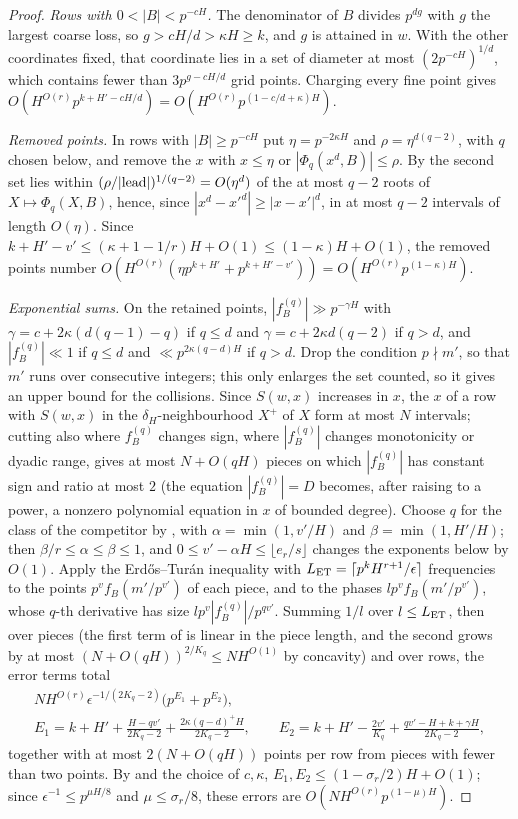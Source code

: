 \documentclass[11pt]{article}
\begin{document}
\begin{proof}
\emph{Rows with $0<|B|<p^{-cH}$.} The denominator of $B$ divides $p^{dg}$ with $g$ the largest coarse
loss, so $g>cH/d>\kappa H\ge k$, and $g$ is attained in $w$. With the other coordinates fixed, that
coordinate lies in a set of diameter at most $(2p^{-cH})^{1/d}$, which contains fewer than $3p^{g-cH/d}$
grid points. Charging every fine point gives $O(H^{O(r)}p^{k+H'-cH/d})=O(H^{O(r)}p^{(1-c/d+\kappa)H})$.

\emph{Removed points.} In rows with $|B|\ge p^{-cH}$ put $\eta=p^{-2\kappa H}$ and $\rho=\eta^{d(q-2)}$, with
$q$ chosen below, and remove the $x$ with $x\le\eta$ or $|\Phi_q(x^d,B)|\le\rho$. By  the
second set lies within $(\rho/|{\rm lead}|)^{1/(q-2)}=O(\eta^d)$ of the at most $q-2$ roots of
$X\mapsto\Phi_q(X,B)$, hence, since $|x^d-x'^d|\ge|x-x'|^d$, in at most $q-2$ intervals of length
$O(\eta)$. Since $k+H'-v'\le(\kappa+1-1/r)H+O(1)\le(1-\kappa)H+O(1)$, the removed points number
$O(H^{O(r)}(\eta p^{k+H'}+p^{k+H'-v'}))=O(H^{O(r)}p^{(1-\kappa)H})$.

\emph{Exponential sums.} On the retained points, $|f_B^{(q)}|\gg p^{-\gamma H}$ with
$\gamma=c+2\kappa(d(q-1)-q)$ if $q\le d$ and $\gamma=c+2\kappa d(q-2)$ if $q>d$, and $|f_B^{(q)}|\ll1$ if
$q\le d$ and $\ll p^{2\kappa(q-d)H}$ if $q>d$. Drop the condition $p\nmid m'$, so that $m'$ runs over
consecutive integers; this only enlarges the set counted, so it gives an upper bound for the collisions. Since $S(w,x)$ increases in $x$, the
$x$ of a row with $S(w,x)$ in the $\delta_H$-neighbourhood $X^+$ of $X$ form at most $N$ intervals; cutting
also where $f_B^{(q)}$ changes sign, where $|f_B^{(q)}|$ changes monotonicity or dyadic range, gives at most $N+O(qH)$ pieces on
which $|f_B^{(q)}|$ has constant sign and ratio at most $2$ (the equation $|f_B^{(q)}|=D$ becomes, after
raising to a power, a nonzero polynomial equation in $x$ of bounded degree). Choose $q$ for the class of
the competitor by , with $\alpha=\min(1,v'/H)$ and $\beta=\min(1,H'/H)$; then $\beta/r\le\alpha\le\beta\le1$, and
$0\le v'-\alpha H\le\lfloor e_r/s\rfloor$ changes the exponents below by $O(1)$. Apply the
Erd\H{o}s--Tur\'an inequality \cite[Chapter~2, Theorem~2.5]{KN} with $L_{\rm ET}=\lceil p^kH^{r+1}/\epsilon\rceil$
frequencies to the points $p^vf_B(m'/p^{v'})$ of each piece, and  to the phases
$lp^vf_B(m'/p^{v'})$, whose $q$-th derivative has size $lp^v|f_B^{(q)}|/p^{qv'}$. Summing $1/l$ over
$l\le L_{\rm ET}$, then over pieces (the first term of  is linear in the piece length, and
the second grows by at most $(N+O(qH))^{2/K_q}\le NH^{O(1)}$ by concavity) and over rows, the error terms
total
\begin{gather*}
NH^{O(r)}\epsilon^{-1/(2K_q-2)}\bigl(p^{E_1}+p^{E_2}\bigr),\\
E_1=k+H'+\frac{H-qv'}{2K_q-2}+\frac{2\kappa(q-d)^+H}{2K_q-2},\qquad
E_2=k+H'-\frac{2v'}{K_q}+\frac{qv'-H+k+\gamma H}{2K_q-2},
\end{gather*}
together with at most $2(N+O(qH))$ points per row from pieces with fewer than two points. By
 and the choice of $c,\kappa$, $E_1,E_2\le(1-\sigma_r/2)H+O(1)$; since
$\epsilon^{-1}\le p^{\mu H/8}$ and $\mu\le\sigma_r/8$, these errors are $O(NH^{O(r)}p^{(1-\mu)H})$.


\end{proof}
\end{document}
